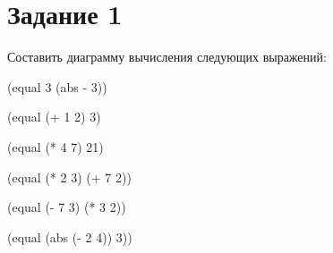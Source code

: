 \chapter*{Задание 1}
Составить диаграмму вычисления следующих выражений:

(equal 3 (abs - 3))

(equal (+ 1 2) 3) 

(equal (* 4 7) 21)

(equal (* 2 3) (+ 7 2))

(equal (- 7 3) (* 3 2))

(equal (abs (- 2 4)) 3))